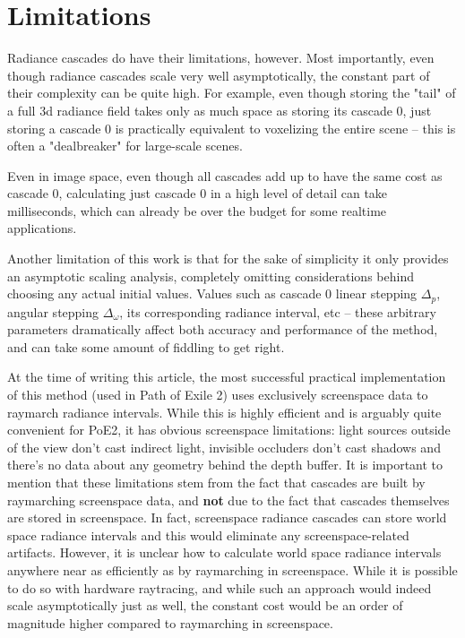 \documentclass{jcgt}
\begin{document}
\section{Limitations}
Radiance cascades do have their limitations, however. Most importantly, even though radiance cascades scale very well asymptotically, the constant part of their complexity can be quite high. For example, even though storing the "tail" of a full 3d radiance field takes only as much space as storing its cascade 0, just storing a cascade 0 is practically equivalent to voxelizing the entire scene -- this is often a "dealbreaker" for large-scale scenes.

Even in image space, even though all cascades add up to have the same cost as cascade 0, calculating just cascade 0 in a high level of detail can take milliseconds, which can already be over the budget for some realtime applications.

Another limitation of this work is that for the sake of simplicity it only provides an asymptotic scaling analysis, completely omitting considerations behind choosing any actual initial values. Values such as cascade 0 linear stepping $\Delta_p$, angular stepping $\Delta_\omega$, its corresponding radiance interval, etc -- these arbitrary parameters dramatically affect both accuracy and performance of the method, and can take some amount of fiddling to get right.

At the time of writing this article, the most successful practical implementation of this method (used in Path of Exile 2) uses exclusively screenspace data to raymarch radiance intervals. While this is highly efficient and is arguably quite convenient for PoE2, it has obvious screenspace limitations: light sources outside of the view don't cast indirect light, invisible occluders don't cast shadows and there's no data about any geometry behind the depth buffer. It is important to mention that these limitations stem from the fact that cascades are built by raymarching screenspace data, and \textbf{not} due to the fact that cascades themselves are stored in screenspace. In fact, screenspace radiance cascades can store world space radiance intervals and this would eliminate any screenspace-related artifacts. However, it is unclear how to calculate world space radiance intervals anywhere near as efficiently as by raymarching in screenspace. While it is possible to do so with hardware raytracing, and while such an approach would indeed scale asymptotically just as well, the constant cost would be an order of magnitude higher compared to raymarching in screenspace.
\end{document}
